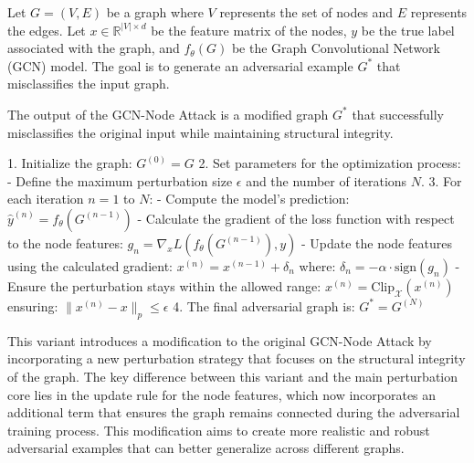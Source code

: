 Let $G = (V, E)$ be a graph where $V$ represents the set of nodes and $E$ represents the edges. Let $x \in \mathbb{R}^{|V| \times d}$ be the feature matrix of the nodes, $y$ be the true label associated with the graph, and $f_{\theta}(G)$ be the Graph Convolutional Network (GCN) model. The goal is to generate an adversarial example $G^*$ that misclassifies the input graph.

The output of the GCN-Node Attack is a modified graph $G^*$ that successfully misclassifies the original input while maintaining structural integrity.

1. Initialize the graph:
   $G^{(0)} = G$
2. Set parameters for the optimization process:
   - Define the maximum perturbation size $\epsilon$ and the number of iterations $N$.
3. For each iteration $n = 1$ to $N$:
   - Compute the model's prediction:
   $\hat{y}^{(n)} = f_{\theta}(G^{(n-1)})$
   - Calculate the gradient of the loss function with respect to the node features:
   $g_n = \nabla_x L(f_{\theta}(G^{(n-1)}), y)$
   - Update the node features using the calculated gradient:
   $x^{(n)} = x^{(n-1)} + \delta_n$
   where:
   $\delta_n = -\alpha \cdot \text{sign}(g_n)$
   - Ensure the perturbation stays within the allowed range:
   $x^{(n)} = \text{Clip}_{\mathcal{X}}(x^{(n)})$
   ensuring:
   $\|x^{(n)} - x\|_p \leq \epsilon$
4. The final adversarial graph is:
   $G^* = G^{(N)}$

This variant introduces a modification to the original GCN-Node Attack by incorporating a new perturbation strategy that focuses on the structural integrity of the graph. 
The key difference between this variant and the main perturbation core lies in the update rule for the node features, which now incorporates an additional term that ensures the graph remains connected during the adversarial training process. This modification aims to create more realistic and robust adversarial examples that can better generalize across different graphs.